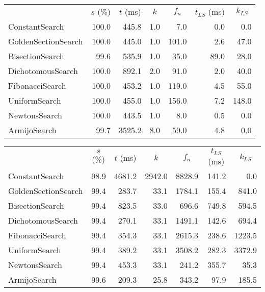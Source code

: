 \documentclass[a4paper,english,titlepage,12pt]{article}
\begin{document}
\begin{center}
\label{tab:performance_results_MatrixSquareSum}
\begin{tabular}{|l|r|r|r|r|r|r|}
\hline
\rowcolor{gray!25}
\multicolumn{1}{|c|}{Line Search Name} & \multicolumn{1}{c|}{$s$ (\%)} & \multicolumn{1}{c|}{$t$ (ms)} & \multicolumn{1}{c|}{$k$} & \multicolumn{1}{c|}{$f_n$} & \multicolumn{1}{c|}{$t_{LS}$ (ms)} & \multicolumn{1}{c|}{$k_{LS}$} \\
ConstantSearch & 100.0 & 445.8 & 1.0 & 7.0 & 0.0 & 0.0 \\
GoldenSectionSearch & 100.0 & 445.0 & 1.0 & 101.0 & 2.6 & 47.0 \\
BisectionSearch & 99.6 & 535.9 & 1.0 & 35.0 & 89.0 & 28.0 \\
DichotomousSearch & 100.0 & 892.1 & 2.0 & 91.0 & 2.0 & 40.0 \\
FibonacciSearch & 100.0 & 453.2 & 1.0 & 119.0 & 4.5 & 55.0 \\
UniformSearch & 100.0 & 455.0 & 1.0 & 156.0 & 7.2 & 148.0 \\
NewtonsSearch & 100.0 & 443.5 & 1.0 & 8.0 & 0.5 & 0.0 \\
ArmijoSearch & 99.7 & 3525.2 & 8.0 & 59.0 & 4.8 & 0.0 \\

\hline
\end{tabular}
\end{center}

\begin{center}
\label{tab:performance_results_MatrixSquareSum}
\begin{tabular}{|l|r|r|r|r|r|r|}
\hline
\rowcolor{gray!25}
\multicolumn{1}{|c|}{Line Search Name} & \multicolumn{1}{c|}{$s$ (\%)} & \multicolumn{1}{c|}{$t$ (ms)} & \multicolumn{1}{c|}{$k$} & \multicolumn{1}{c|}{$f_n$} & \multicolumn{1}{c|}{$t_{LS}$ (ms)} & \multicolumn{1}{c|}{$k_{LS}$} \\
ConstantSearch & 98.9 & 4681.2 & 2942.0 & 8828.9 & 141.2 & 0.0 \\
GoldenSectionSearch & 99.4 & 283.7 & 33.1 & 1784.1 & 155.4 & 841.0 \\
BisectionSearch & 99.4 & 823.5 & 33.0 & 696.6 & 749.8 & 594.5 \\
DichotomousSearch & 99.4 & 270.1 & 33.1 & 1491.1 & 142.6 & 694.4 \\
FibonacciSearch & 99.4 & 354.3 & 33.1 & 2615.3 & 238.6 & 1223.5 \\
UniformSearch & 99.4 & 389.2 & 33.1 & 3508.2 & 282.3 & 3372.9 \\
NewtonsSearch & 99.4 & 453.3 & 33.1 & 241.2 & 355.7 & 35.3 \\
ArmijoSearch & 99.6 & 209.3 & 25.8 & 343.2 & 97.9 & 185.5 \\

\hline
\end{tabular}
\end{center}
\end{document}
